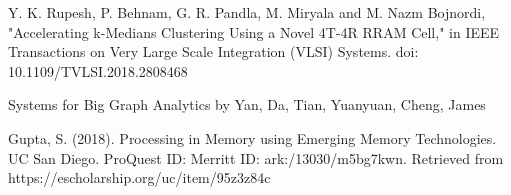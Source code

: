 \documentclass[journal,onecolumn]{IEEEtran}
\begin{document}
\begin{thebibliography}{10}
 Y. K. Rupesh, P. Behnam, G. R. Pandla, M. Miryala and M. Nazm Bojnordi, "Accelerating k-Medians Clustering Using a Novel 4T-4R RRAM Cell," in IEEE Transactions on Very Large Scale Integration (VLSI) Systems. doi: 10.1109/TVLSI.2018.2808468

 Systems for Big Graph Analytics by Yan, Da, Tian, Yuanyuan, Cheng, James

 Gupta, S. (2018). Processing in Memory using Emerging Memory Technologies. UC San Diego. ProQuest ID: 
Merritt ID: ark:/13030/m5bg7kwn. Retrieved from https://escholarship.org/uc/item/95z3z84c

\end{thebibliography}




\end{document}
